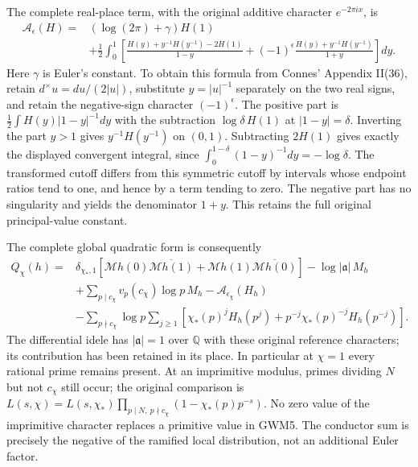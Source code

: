 The complete real-place term, with the original additive character
$e^{-2\pi ix}$, is
\begin{equation}\tag{GWM4}
 \begin{split}
 \mathcal A_\epsilon(H)={}&(\log(2\pi)+\gamma)H(1)\\
 &+\frac12\int_0^1\left[
 \frac{H(y)+y^{-1}H(y^{-1})-2H(1)}{1-y}
 +(-1)^\epsilon\frac{H(y)+y^{-1}H(y^{-1})}{1+y}
 \right]dy.
 \end{split}
\end{equation}
Here $\gamma$ is Euler's constant. To obtain this formula from Connes'
Appendix II(36), retain $d^\times u=du/(2|u|)$, substitute $y=|u|^{-1}$
separately on the two real signs, and retain the negative-sign character
$(-1)^\epsilon$. The positive part is
$\tfrac12\int H(y)|1-y|^{-1}dy$ with the subtraction
$\log\delta\,H(1)$ at $|1-y|=\delta$. Inverting the part $y>1$
gives $y^{-1}H(y^{-1})$ on $(0,1)$. Subtracting $2H(1)$ gives exactly
the displayed convergent integral, since
$\int_0^{1-\delta}(1-y)^{-1}dy=-\log\delta$.
The transformed cutoff differs from this symmetric cutoff by intervals
whose endpoint ratios tend to one, and hence by a term tending to zero.
The negative part has no singularity and yields the denominator $1+y$.
This retains the full original principal-value constant.

The complete global quadratic form is consequently
\begin{equation}\tag{GWM5}
 \begin{split}
 Q_\chi(h)={}&\delta_{\chi_*,1}\left[
 \mathcal Mh(0)\overline{\mathcal Mh(1)}+
 \mathcal Mh(1)\overline{\mathcal Mh(0)}\right]
 -\log|\mathfrak a|\,M_h\\
 &+\sum_{p\mid c_\chi}v_p(c_\chi)\log p\,M_h
 -\mathcal A_{\epsilon_\chi}(H_h)\\
 &-\sum_{p\nmid c_\chi}\log p\sum_{j\ge1}
 \left[\chi_*(p)^j H_h(p^j)
       +p^{-j}\chi_*(p)^{-j}H_h(p^{-j})\right].
 \end{split}
\end{equation}
The differential idele has $|\mathfrak a|=1$ over $\mathbb Q$ with these
original reference characters; its contribution has been retained in its
place. In particular at $\chi=1$ every rational prime remains present.
At an imprimitive modulus, primes dividing $N$ but not $c_\chi$ still
occur; the original comparison is
$L(s,\chi)=L(s,\chi_*)\prod_{p\mid N,\ p\nmid c_\chi}
(1-\chi_*(p)p^{-s})$. No zero value of the imprimitive character replaces
a primitive value in GWM5. The conductor sum is precisely the negative
of the ramified local distribution, not an additional Euler factor.

